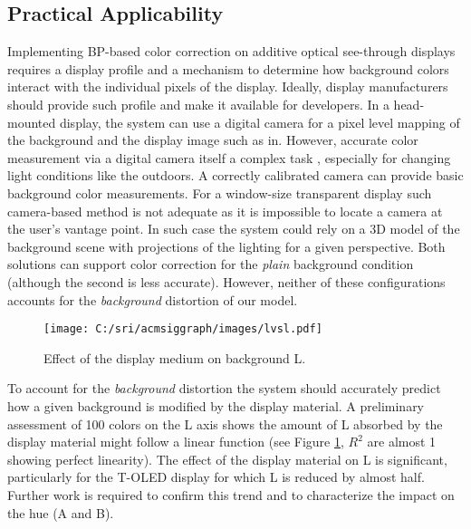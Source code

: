 \documentclass[annual]{acmsiggraph}
\begin{document}
\subsection{Practical Applicability}
Implementing BP-based color correction on additive optical see-through displays requires a display profile and a mechanism to determine how background colors interact with the individual pixels of the display. Ideally, display manufacturers should provide such profile and make it available for developers. In a head-mounted display, the system can use a digital camera for a pixel level mapping of the background and the display image such as in\cite{Bimber:2005}\cite{Weiland:2009}. However, accurate color measurement via a digital camera itself a complex task \cite{Hong:2001}, especially for changing light conditions like the outdoors. A correctly calibrated camera can provide basic background color measurements. For a window-size transparent display such camera-based method is not adequate as it is impossible to locate a camera at the user's vantage point. In such case the system could rely on a 3D model of the background scene with projections of the lighting for a given perspective. Both solutions can support color correction for the \textit{plain} background condition (although the second is less accurate). However, neither of these configurations accounts for the \textit{background} distortion of our model.
\begin{figure}[ht]
  \centering
  \texttt{[image: C:/sri/acmsiggraph/images/lvsl.pdf]}
  \caption{Effect of the display medium on background L.}
    \label{fig:Figure15}
\end{figure}

To account for the \textit{background} distortion the system should accurately predict how a given background is modified by the display material. A preliminary assessment of 100 colors on the L axis shows the amount of L absorbed by the display material might follow a linear function (see Figure \ref{fig:Figure15}, $R^2$ are almost 1 showing perfect linearity). The effect of the display material on L is significant, particularly for the T-OLED display for which L is reduced by almost half. Further work is required to confirm this trend and to characterize the impact on the hue (A and B).
\end{document}
